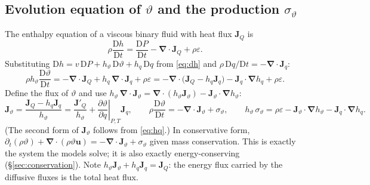 \documentclass[11pt,a4paper]{article}
\newcommand{\vt}{\vartheta}                    %
\newcommand{\hth}{{h_{\vartheta}}}               %
\newcommand{\hq}{{h_q}}                          %
\newcommand{\bu}{\mathbf{u}}
\newcommand{\bJ}{\mathbf{J}}
\newcommand{\bnabla}{\boldsymbol{\nabla}}
\newcommand{\pdc}[3]{\left.\frac{\partial #1}{\partial #2}\right|_{#3}}
\begin{document}
\subsection{Evolution equation of $\vt$ and the production $\sigma_\vt$}\label{sec:sigma}
The enthalpy equation of a viscous binary fluid with heat flux $\bJ_Q$ is
\begin{equation}
  \rho\frac{\mathrm{D}h}{\mathrm{D}t}=\frac{\mathrm{D}P}{\mathrm{D}t}-\bnabla\!\cdot\bJ_Q+\rho\varepsilon .
\end{equation}
Substituting $\mathrm{D}h=v\,\mathrm{D}P+\hth\,\mathrm{D}\vt+\hq\,\mathrm{D}q$ from \eqref{eq:dh} and $\rho\,\mathrm{D}q/\mathrm{D}t=-\bnabla\!\cdot\bJ_q$:
\begin{equation}
  \rho\hth\frac{\mathrm{D}\vt}{\mathrm{D}t}=-\bnabla\!\cdot\bJ_Q+\hq\,\bnabla\!\cdot\bJ_q+\rho\varepsilon
  =-\bnabla\!\cdot\big(\bJ_Q-\hq\bJ_q\big)-\bJ_q\!\cdot\bnabla\hq+\rho\varepsilon .
\end{equation}
Define the flux of $\vt$ and use $\hth\,\bnabla\!\cdot\bJ_\vt=\bnabla\!\cdot(\hth\bJ_\vt)-\bJ_\vt\!\cdot\bnabla\hth$:
\begin{equation}
  \bJ_\vt=\frac{\bJ_Q-\hq\bJ_q}{\hth}=\frac{\bJ'_Q}{\hth}+\pdc{\vt}{q}{P,T}\bJ_q,\qquad
  \rho\frac{\mathrm{D}\vt}{\mathrm{D}t}=-\bnabla\!\cdot\bJ_\vt+\sigma_\vt,\qquad
  \hth\,\sigma_\vt=\rho\varepsilon-\bJ_\vt\!\cdot\bnabla\hth-\bJ_q\!\cdot\bnabla\hq .
  \label{eq:sigma}
\end{equation}
(The second form of $\bJ_\vt$ follows from \eqref{eq:hq}.) In conservative form, $\partial_t(\rho\vt)+\bnabla\!\cdot(\rho\vt\bu)=-\bnabla\!\cdot\bJ_\vt+\sigma_\vt$ given mass conservation. This is exactly the
system the models solve; it is also exactly energy-conserving (\S\ref{sec:conservation}). Note $\hth\bJ_\vt+\hq\bJ_q=\bJ_Q$: the energy flux carried by the diffusive fluxes is the total heat flux.
\end{document}
